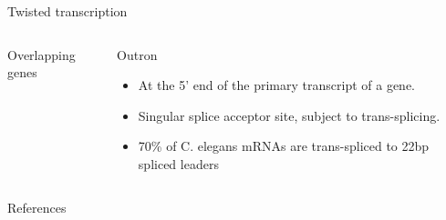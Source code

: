 \documentclass[10pt]{beamer}
\begin{document}

\begin{frame}{Twisted transcription}
\begin{columns}[T,onlytextwidth]
	
	
	\begin{alertblock}{Overlapping genes}

	\end{alertblock}


	\begin{alertblock}{Outron}
	\begin{itemize}
		\item At the 5' end of the primary transcript of a gene.
		\item Singular splice acceptor site, subject to trans-splicing.
		\item 70\% of C. elegans mRNAs are trans-spliced to 22bp spliced leaders
	\end{itemize}
	\end{alertblock}

\end{columns}
\end{frame}


\appendix

\begin{frame}[allowframebreaks]{References}


\end{frame}
\end{document}
